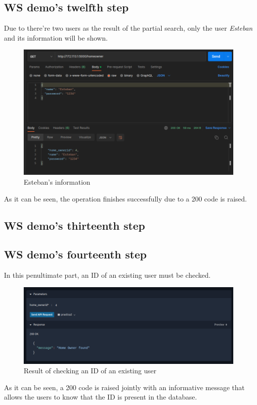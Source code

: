 \documentclass[a4paper,12pt]{article}
\begin{document}
\subsection*{WS demo's twelfth step}
Due to there're two users as the result of the partial search, only the user \textit{Esteban} and its information will be shown.
\begin{figure}[H]
    \centering
    \includegraphics[scale = 0.5]{images/Esteban GET.png}
    \caption{Esteban's information}
    \label{fig:estebanG}
\end{figure}
As it can be seen, the operation finishes successfully due to a 200 code is raised.
\subsection*{WS demo's thirteenth step}

\subsection*{WS demo's fourteenth step}
In this penultimate part, an ID of an existing user must be checked.
\begin{figure}[H]
    \centering
    \includegraphics[scale = 0.5]{images/check id existent.png}
    \caption{Result of checking an ID of an existing user}
    \label{fig:idExist}
\end{figure}
As it can be seen, a 200 code is raised jointly with an informative message that allows the users to know that the ID is present in the database.
\end{document}
